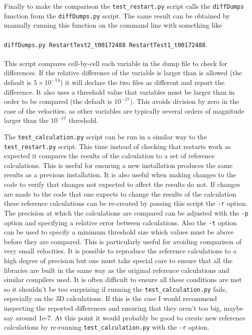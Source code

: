 \documentclass[12pt,a4paper]{book}
\begin{document}
Finally to make the comparison the {\tt test\_restart.py} script calls the {\tt diffDumps} function from the {\tt diffDumps.py} script. The same result can be obtained by manually running this function on the command line with something like\\
 \\
{\tt diffDumps.py RestartTest2\_t00172488 RestartTest1\_t00172488}.\\
 \\
This script compares cell-by-cell each variable in the dump file to check for differences. If the relative difference of the variable is larger than is allowed (the default is $5\times10^{-14}$) it will declare the two files as different and report the difference. It also uses a threshold value that variables must be larger than in order to be compared (the default is $10^{-17}$). This avoids division by zero in the case of the velocities, as other variables are typically several orders of magnitude larger than the $10^{-17}$ threshold.

The {\tt test\_calculation.py} script can be run in a similar way to the {\tt test\_restart.py} script. This time instead of checking that restarts work as expected it compares the results of the calculation to a set of reference calculations. This is useful for ensuring a new installation produces the same results as a previous installation. It is also useful when making changes to the code to verify that changes not expected to affect the results do not. If changes are made to the code that one expects to change the results of the calculation these reference calculations can be re-created by passing this script the {\tt -r} option. The precision at which the calculations are compared can be adjusted with the {\tt -p} option and specifying a relative error between calculations. Also the {\tt -t} option can be used to specify a minimum threshold size which values must be above before they are compared. This is particularly useful for avoiding comparison of very small velocities. It is possible to reproduce the reference calculations to a high degree of precision but one must take special care to ensure that all the libraries are built in the same way as the original reference calculations and similar compilers used. It is often difficult to ensure all these conditions are met so it shouldn't be too surprising if running the {\tt test\_calculation.py} fails, especially on the 3D calculations. If this is the case I would recommend inspecting the reported differences and ensuring that they aren't too big, maybe say around 1e-7. At this point it would probably be good to create new reference calculations by re-running {\tt test\_calculation.py} with the {\tt -r} option.
\end{document}
